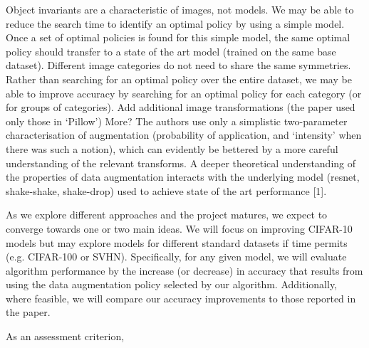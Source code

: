 \documentclass[10pt,twocolumn,letterpaper]{article}
\begin{document}
Object invariants are a characteristic of images, not models. We may be able to reduce the search time to identify an optimal policy by using a simple model. Once a set of optimal policies is found for this simple model, the same optimal policy should transfer to a state of the art model (trained on the same base dataset).
Different image categories do not need to share the same symmetries. Rather than searching for an optimal policy over the entire dataset, we may be able to improve accuracy by searching for an optimal policy for each category (or for groups of categories).
Add additional image transformations (the paper used only those in ‘Pillow’)
More?
The authors use only a simplistic two-parameter characterisation of augmentation (probability of application, and ‘intensity’ when there was such a notion), which can evidently be bettered by a more careful understanding of the relevant transforms.
A deeper theoretical understanding of the properties of data augmentation interacts with the underlying model (resnet, shake-shake, shake-drop) used to achieve state of the art performance [1].

As we explore different approaches and the project matures, we expect to converge towards one or two main ideas. We will focus on improving CIFAR-10 models but may explore models for different standard datasets if time permits (e.g. CIFAR-100 or SVHN). Specifically, for any given model, we will evaluate algorithm performance by the increase (or decrease) in accuracy that results from using the data augmentation policy selected by our algorithm. Additionally, where feasible, we will compare our accuracy improvements to those reported in the paper. 

As an assessment criterion, 


\cite{Recht2018}
\cite{Devries2017}



{\small


}
\end{document}
